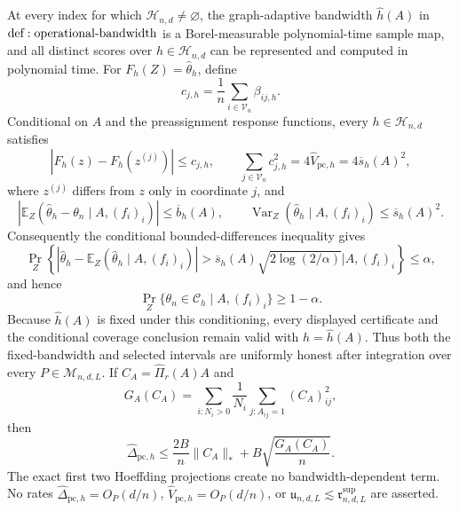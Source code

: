 At every index for which \(\mathcal H_{n,d}\ne\varnothing\), the graph-adaptive bandwidth \(\widehat h(A)\) in \({\rm def:operational\text{-}bandwidth}\) is a Borel-measurable polynomial-time sample map, and all distinct scores over \(h\in\mathcal H_{n,d}\) can be represented and computed in polynomial time.  For \(F_h(Z)=\widehat\theta_h\), define
\[
 c_{j,h}=\frac1n\sum_{i\in\mathcal V_n}\beta_{ij,h}.
\]
Conditional on \(A\) and the preassignment response functions, every \(h\in\mathcal H_{n,d}\) satisfies
\[
 |F_h(z)-F_h(z^{(j)})|\leq c_{j,h},
 \qquad
 \sum_{j\in\mathcal V_n}c_{j,h}^2
 =4\widehat V_{\mathrm{pc},h}=4\overline s_h(A)^2,
\]
where \(z^{(j)}\) differs from \(z\) only in coordinate \(j\), and
\[
 \left|\mathbb E_Z(\widehat\theta_h-\theta_n\mid A,(f_i)_i)\right|
 \leq\overline b_h(A),
 \qquad
 \operatorname{Var}_Z(\widehat\theta_h\mid A,(f_i)_i)
 \leq\overline s_h(A)^2.
\]
Consequently the conditional bounded-differences inequality gives
\[
 \Pr_Z\!\left\{
 |\widehat\theta_h-\mathbb E_Z(\widehat\theta_h\mid A,(f_i)_i)|
 >\overline s_h(A)\sqrt{2\log(2/\alpha)}
 \mathrel{\Big|}A,(f_i)_i\right\}\leq\alpha,
\]
and hence
\[
 \Pr_Z\{\theta_n\in\mathcal C_h\mid A,(f_i)_i\}\geq1-\alpha.
\]
Because \(\widehat h(A)\) is fixed under this conditioning, every displayed certificate and the conditional coverage conclusion remain valid with \(h=\widehat h(A)\).  Thus both the fixed-bandwidth and selected intervals are uniformly honest after integration over every \(P\in\mathcal M_{n,d,L}\).  If \(C_A=\widehat\Pi_r(A)A\) and
\[
 G_A(C_A)=\sum_{i:N_i>0}\frac1{N_i}\sum_{j:A_{ij}=1}(C_A)_{ij}^2,
\]
then
\[
 \widehat\Delta_{\mathrm{pc},h}
 \leq \frac{2B}{n}\|C_A\|_*
      +B\sqrt{\frac{G_A(C_A)}{n}}.
\]
The exact first two Hoeffding projections create no bandwidth-dependent term.  No rates \(\widehat\Delta_{\mathrm{pc},h}=O_P(d/n)\), \(\widehat V_{\mathrm{pc},h}=O_P(d/n)\), or \(\mathfrak u_{n,d,L}\lesssim\mathfrak r^{\mathrm{sup}}_{n,d,L}\) are asserted.